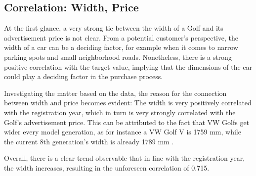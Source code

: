 \subsection{Correlation: Width, Price}
At the first glance, a very strong tie between the width of a Golf and its advertisement price is not clear.
From a potential customer's perspective, the width of a car can be a deciding factor, for example when it comes to
narrow parking spots and small neighborhood roads.
Nonetheless, there is a strong positive correlation with the target value, implying that the dimensions of the car
could play a deciding factor in the purchase process.
\par
Investigating the matter based on the data, the reason for the connection between width and price becomes evident:
The width is very positively correlated with the registration year, which in turn is very strongly correlated with the Golf's advertisement price.
This can be attributed to the fact that VW Golfs get wider every model generation, as for instance a VW Golf V is 1759 mm,
while the current 8th generation's width is already 1789 mm \autocite{VolkswagenGolfTechnical}.
\par
Overall, there is a clear trend observable that in line with the registration year, the width increases,
resulting in the unforeseen correlation of 0.715.

